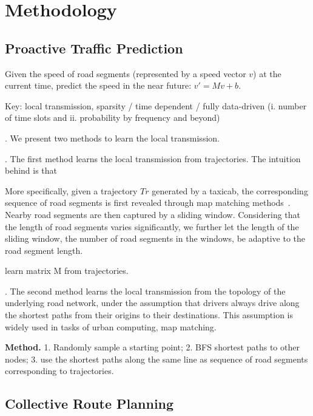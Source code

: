 \section{Methodology}
\label{sec-method}


\subsection{Proactive Traffic Prediction}
\label{subsec-proactive}

Given the speed of road segments (represented by a speed vector $v$) at the current time, predict the speed in the near future: $v'=Mv+b$.

Key: local transmission, \ie sparsity / time dependent / fully data-driven (i. number of time slots and ii. probability by frequency and beyond)


. We present two methods to learn the local transmission.

.
The first method learns the local transmission from trajectories. The intuition behind is that 

More specifically, given a trajectory $Tr$ generated by a taxicab, the corresponding sequence of road segments is first revealed through map matching methods~\cite{Newson2009MM}. Nearby road segments are then captured by a sliding window. Considering that the length of road segments varies significantly, we further let the length of the sliding window, \ie the number of road segments in the windows, be adaptive to the road segment length. 

\begin{example}
learn matrix M from trajectories. 
\end{example}

. 
The second method learns the local transmission from the topology of the underlying road network, under the assumption that drivers always drive along the shortest paths from their origins to their destinations. This assumption is widely used in tasks of urban computing, \eg map matching. 

{\bf Method.} 1. Randomly sample a starting point; 2. BFS shortest paths to other nodes; 3. use the shortest paths along the same line as sequence of road segments corresponding to trajectories.






\subsection{Collective Route Planning}
\label{subsec-route}

